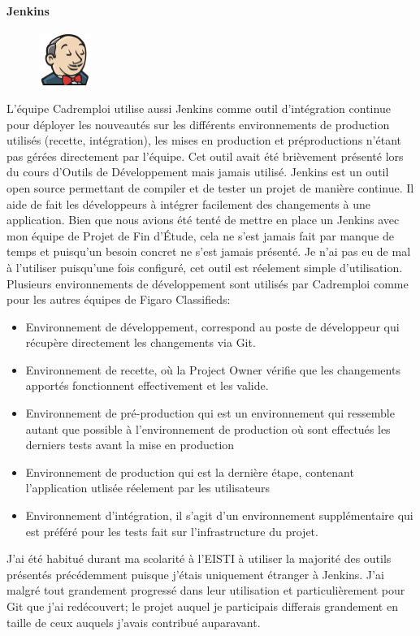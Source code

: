 \paragraph{Jenkins}
\label{par:Jenkins}
\begin{figure}
  \begin{center}
    \includegraphics[width=0.15\textwidth]{Pictures/jenkins_logo.png}
  \end{center}
\end{figure}
L'équipe Cadremploi utilise aussi Jenkins comme outil d'intégration continue pour déployer les nouveautés sur les différents environnements de production utilisés (recette, intégration), les mises en production et préproductions n'étant pas gérées directement par l'équipe.
Cet outil avait été brièvement présenté lors du cours d'Outils de Développement mais jamais utilisé.
Jenkins est un outil open source permettant de compiler et de tester un projet de manière continue.
Il aide de fait les développeurs à intégrer facilement des changements à une application.
Bien que nous avions été tenté de mettre en place un Jenkins avec mon équipe de Projet de Fin d'Étude, cela ne s'est jamais fait par manque de temps et puisqu'un besoin concret ne s'est jamais présenté.
Je n'ai pas eu de mal à l'utiliser puisqu'une fois configuré, cet outil est réelement simple d'utilisation.
Plusieurs environnements de développement sont utilisés par Cadremploi comme pour les autres équipes de Figaro Classifieds:
\begin{itemize}
  \item{Environnement de développement}, correspond au poste de développeur qui récupère directement les changements via Git.
  \item{Environnement de recette}, où la Project Owner vérifie que les changements apportés fonctionnent effectivement et les valide.
  \item{Environnement de pré-production} qui est un environnement qui ressemble autant que possible à l'environnement de production où sont effectués les derniers tests avant la mise en production
  \item{Environnement de production} qui est la dernière étape, contenant l'application utlisée réelement par les utilisateurs
  \item{Environnement d'intégration}, il s'agit d'un environnement supplémentaire qui est préféré pour les tests fait sur l'infrastructure du projet.
\end{itemize}
J'ai été habitué durant ma scolarité à l'EISTI à utiliser la majorité des outils présentés précédemment puisque j'étais uniquement étranger à Jenkins.
J'ai malgré tout grandement progressé dans leur utilisation et particulièrement pour Git que j'ai redécouvert; le projet auquel je participais differais grandement en taille de ceux auquels j'avais contribué auparavant.
